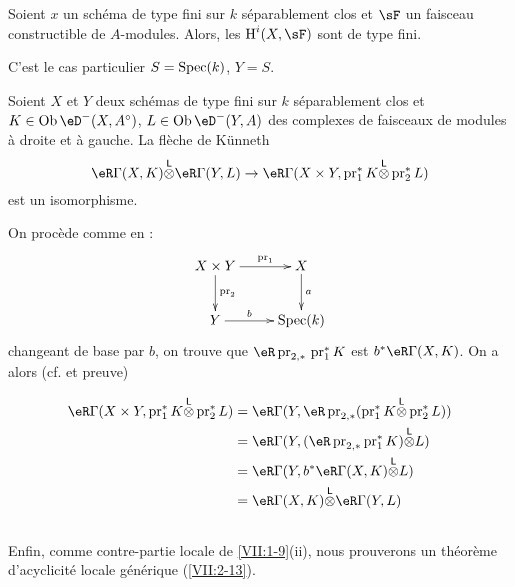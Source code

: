 \begin{corollary_}\label{VII:1-10}
Soient $x$ un sch\'ema de type fini sur $k$ s\'eparablement clos et $\sF$ un 
faisceau constructible de $A$-modules. Alors, les $\h^i(X,\sF)$ sont de type 
fini. 
\end{corollary_}

C'est le cas particulier $S=\operatorname{Spec}(k)$, $Y=S$. 

\begin{corollary_}\label{VII:1-11}
Soient $X$ et $Y$ deux sch\'emas de type fini sur $k$ s\'eparablement clos et 
$K\in \ob\eD^-(X,A^\circ)$, $L\in \ob\eD^-(Y,A)$ des complexes de faisceaux de 
modules \`a droite et \`a gauche. La fl\`eche de K\"unneth 
\[
  \eR \Gamma(X,K) \lotimes \eR \Gamma(Y,L) \to \eR\Gamma(X\times Y,\operatorname{pr}_1^\ast K \lotimes \operatorname{pr}_2^\ast L) 
\]
est un isomorphisme. 
\end{corollary_}

On proc\`ede comme en \cite[XVII 5.4.3]{sga4}: 
\[\xymatrix{
  X\times Y \ar[r]^-{\text{pr}_1} \ar[d]^-{\text{pr}_2} 
    & X \ar[d]^-a \\
  Y \ar[r]^-b 
    & \spec(k) 
}\]
changeant de base par $b$, on trouve que 
$\eR\operatorname{pr}_{2,\ast}{} \operatorname{pr}_1^\ast K$ est 
$b^\ast \eR\Gamma(X,K)$. On a alors (cf. \cite[XVII 5.2.11]{sga4} et preuve) 

\begin{align*}
  \eR\Gamma(X\times Y,\operatorname{pr}_1^\ast K\lotimes \operatorname{pr}_2^\ast L) 
    &= \eR\Gamma(Y,\eR \operatorname{pr}_{2,\ast}(\operatorname{pr}_1^\ast K\lotimes \operatorname{pr}_2^\ast L)) \\
    &= \eR\Gamma(Y,(\eR\operatorname{pr}_{2,\ast}\operatorname{pr}_1^\ast K)\lotimes L) \\
    &= \eR\Gamma(Y,b^\ast \eR\Gamma(X,K)\lotimes L) \\
    &= \eR\Gamma(X,K)\lotimes \eR\Gamma(Y,L) 
\end{align*}





\subsection{}\label{VII:1-12}

Enfin, comme contre-partie locale de \ref{VII:1-9}(ii), nous prouverons un 
th\'eor\`eme d'acyclicit\'e locale g\'en\'erique (\ref{VII:2-13}). 










